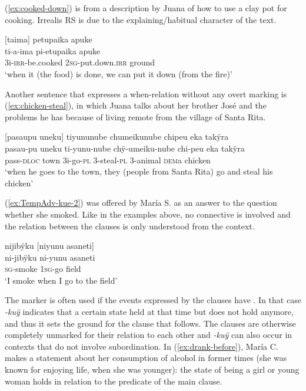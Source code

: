 (\ref{ex:cooked-down}) is from a description by Juana of how to use a clay pot for cooking. Irrealis RS is due to the explaining/habitual character of the text.

\ea\label{ex:cooked-down}
\begingl
\glpreamble \textup{[}taima\textup{]} petupaika apuke\\
\gla ti-a-ima pi-etupaika apuke\\
\glb 3i-\textsc{irr}-be.cooked 2\textsc{sg}-put.down.\textsc{irr} ground\\
\glft ‘when it (the food) is done, we can put it down (from the fire)’
\endgl
\trailingcitation{[jxx-d110923l-3.5]}
\xe

Another sentence that expresses a when-relation without any overt marking is (\ref{ex:chicken-steal}), in which Juana talks about her brother José and the problems he has because of living remote from the village of Santa Rita. 

\ea\label{ex:chicken-steal}
\begingl
\glpreamble \textup{[}pasaupu uneku\textup{]} tiyununube chumeikunube chipeu eka takÿra\\
\gla pasau-pu uneku ti-yunu-nube chÿ-umeiku-nube chi-peu eka takÿra\\
\glb pass-\textsc{dloc} town 3i-go-\textsc{pl} 3-steal-\textsc{pl} 3-animal \textsc{dem}a chicken\\
\glft ‘when he goes to the town, they (people from Santa Rita) go and steal his chicken’
\endgl
\trailingcitation{[jxx-p120515l-2.254]}
\xe

(\ref{ex:TempAdv-kue-2}) was offered by María S. as an answer to the question whether she smoked. Like in the examples above, no connective is involved and the relation between the clauses is only understood from the context.


\ea\label{ex:TempAdv-kue-2}
\begingl
\glpreamble nijibÿku \textup{[}niyunu asaneti\textup{]}\\
\gla ni-jibÿku ni-yunu asaneti\\
\textsc{sg}-smoke 1\textsc{sg}-go field\\
\glft ‘I smoke when I go to the field’
\endgl
\trailingcitation{[rxx-e120511l.390]}%
\xe

The  marker is often used if the events expressed by the clauses have . In that case \textit{-kuÿ} indicates that a certain state held at that time but does not hold anymore, and thus it sets the ground for the clause that follows. The clauses are otherwise completely unmarked for their relation to each other and \textit{-kuÿ} can also occur in contexts that do not involve subordination. In (\ref{ex:drank-before}), María C. makes a statement about her consumption of alcohol in former times (she was known for enjoying life, when she was younger): the state of being a girl or young woman holds in relation to the predicate of the main clause.

